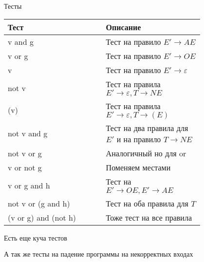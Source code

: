 \newpage

\begin{para}{Тесты}

\begin{table}[h]

\begin{center}

\begin{tabular}{|p{0.4\linewidth}|p{0.4\linewidth}|} 

\hline
\textbf{Тест} & \textbf{Описание}\\
\hline
v and g & Тест на правило $E' \rightarrow AE$\\
\hline
v or g & Тест на правило $E' \rightarrow OE$\\
\hline
v & Тест на правило $E' \rightarrow \varepsilon$\\
\hline
not v & Тест на правила $E' \rightarrow \varepsilon, T \rightarrow NE$\\
\hline
(v) & Тест на правила $E' \rightarrow \varepsilon, T \rightarrow (E)$\\
\hline
not v and g & Тест на два правила для $E'$ и на правило $T \rightarrow NE$\\
\hline
not v or g & Аналогичный но для or\\
\hline
v or not g & Поменяем местами\\
\hline
v or g and h & Тест на $E' \rightarrow OE, E' \rightarrow AE$\\
\hline
not v or (g and h) & Тест на оба правила для $T$\\
\hline
(v or g) and (not h) & Тоже тест на все правила\\
\hline

\end{tabular}

\end{center}

\end{table}

Есть еще куча тестов

А так же тесты на падение программы на некорректных входах

\begin{table}[h]

\begin{center}

\begin{tabular}{|p{0.5\linewidth}|} 


\end{tabular}
\end{center}
\end{table}
\end{para}
